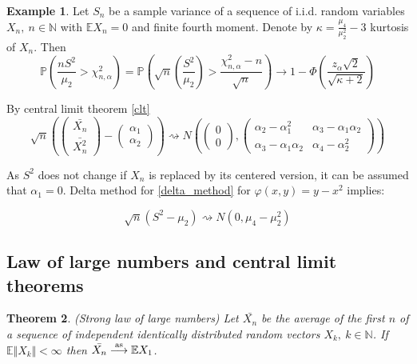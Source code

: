 \documentclass[12pt]{article}
\newtheorem{theorem}{Theorem}[section]
\theoremstyle{definition}
\newtheorem{example}[theorem]{Example}
\theoremstyle{remark}
\numberwithin{equation}{section}
\newcommand{\al}{\alpha}
\newcommand{\PP}{\mathbb{P}}
\newcommand{\NN}{\mathbb{N}}
\newcommand{\EE}{\mathbb{E}}
\newcommand{\convas}{\stackrel{\mathclap{\normalfont\text{as}}}{\longrightarrow}}
\begin{document}
\begin{example}
	Let $S_n$ be a sample variance of a sequence of i.i.d. random variables $X_n,\ n\in\NN$ with $\EE X_n = 0$ and finite fourth moment. Denote by $\kappa = \frac{\mu_4}{\mu_2^2} - 3$ kurtosis of $X_n$. Then
	\begin{equation*}
		\PP\left(\frac{nS^2}{\mu_2} > \chi^2_{n, \alpha}\right) = \PP\left(\sqrt n \left(\frac{S^2}{\mu_2}\right) > \frac{\chi^2_{n, \alpha} - n}{\sqrt n}\right) \rightarrow 1 - \Phi\left(\frac{z_\al\sqrt 2}{\sqrt{\kappa+2}}\right)
	\end{equation*}
\end{example}
\proof By central limit theorem \ref{clt}
\begin{equation*}
	\sqrt n \left(\begin{pmatrix}
		\bar{X_n}\\ \bar{X^2_n}
\end{pmatrix} - \begin{pmatrix}
	\al_1\\ \al_2
\end{pmatrix}\right) \rightsquigarrow N\left(\begin{pmatrix}
	0\\0
\end{pmatrix}, \begin{pmatrix}
	\al_2 - \al_1^2 & \al_3 - \al_1\al_2 \\
	\al_3 - \al_1\al_2 & \al_4 - \al_2^2
\end{pmatrix}\right)
\end{equation*}

\noindent As $S^2$ does not change if $X_n$ is replaced by its centered version, it can be assumed  that $\al_1 = 0$. Delta method for \ref{delta_method} for $\varphi(x, y) = y - x^2$ implies:

\begin{equation*}
	\sqrt{n}\left(S^2 - \mu_2 \right)\rightsquigarrow N(0, \mu_4 - \mu_2^2)
\end{equation*}

\subsection{Law of large numbers and central limit theorems}

\begin{theorem}\label{lln}\emph{(Strong law of large numbers)} Let $\bar{X_n}$ be the average of the first $n$ of a sequence of independent identically distributed random vectors $X_k,\ k\in\NN$. If $\EE \Vert X_k\Vert<\infty$ then $\bar{X_n}\convas\EE X_1$.
\end{theorem}
\end{document}

